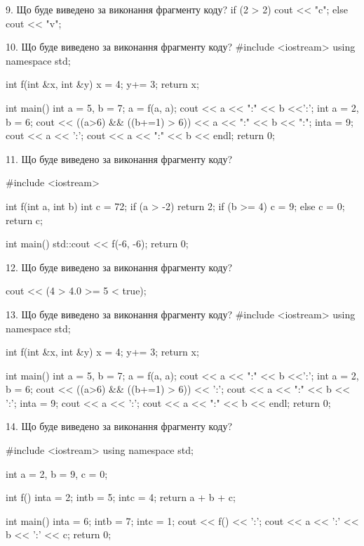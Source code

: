 \documentclass[11pt]{article}
\begin{document}
9. Що буде виведено за виконання фрагменту коду?
if (2 > 2)
    cout << "c";
else
    cout << "v";


10. Що буде виведено за виконання фрагменту коду?
#include <iostream>
using namespace std;

int f(int &x, int &y){
    x = 4;
    y+= 3;
    return x;
}

int main(){
    int a = 5, b = 7;
    a = f(a, a);
    cout << a << ":" << b <<':';
    {
        int a = 2, b = 6;
        cout << ((a>6) && ((b+=1) > 6))
             << a << ":" << b << ":";
    }
    {
        inta = 9;
        cout << a << ':';
    }
    cout << a << ":" << b << endl;
    return 0;
}


11. Що буде виведено за виконання фрагменту коду?

#include <iostream>

int f(int a, int b){
    int c = 72;
    if (a > -2)
        return 2;
    if (b >= 4)
         c = 9;
    else 
        c = 0;
    return c;
}

int main(){
    std::cout << f(-6, -6);
    return 0;
}

12. Що буде виведено за виконання фрагменту коду?

cout << (4 > 4.0 >= 5 < true);

13. Що буде виведено за виконання фрагменту коду?
#include <iostream>
using namespace std;

int f(int &x, int &y){
    x = 4;
    y+= 3;
    return x;
}

int main(){
    int a = 5, b = 7;
    a = f(a, a);
    cout << a << ":" << b <<':';
    {
        int a = 2, b = 6;
        cout << ((a>6) && ((b+=1) > 6)) << ':';
        cout << a << ":" << b << ':';
    }
    {
        inta = 9;
        cout << a << ':';
    }
    cout << a << ":" << b << endl;
    return 0;
}


14. Що буде виведено за виконання фрагменту коду?

#include <iostream>
using namespace std;

int a = 2, b = 9, c = 0;

int f(){
    inta = 2;
    intb = 5;
    intc = 4;
    return a + b + c;
}

int main(){
    inta = 6;
    intb = 7;
    intc = 1;
    cout << f() << ':';
    cout << a << ':' << b << ':' << c;
    return 0;
}
\end{document}
